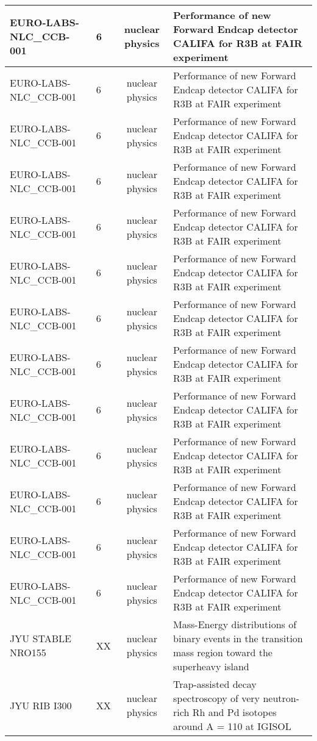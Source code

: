 \begin{xltabular}{\textwidth}{|l|p{0.12\textwidth}|c|Y|}
EURO-LABS-NLC\_CCB-001 & 6 & nuclear physics & Performance of new Forward Endcap detector
CALIFA for R3B at FAIR experiment \\ \hline
EURO-LABS-NLC\_CCB-001 & 6 & nuclear physics & Performance of new Forward Endcap detector
CALIFA for R3B at FAIR experiment \\ \hline
EURO-LABS-NLC\_CCB-001 & 6 & nuclear physics & Performance of new Forward Endcap detector
CALIFA for R3B at FAIR experiment \\ \hline
EURO-LABS-NLC\_CCB-001 & 6 & nuclear physics & Performance of new Forward Endcap detector
CALIFA for R3B at FAIR experiment \\ \hline
EURO-LABS-NLC\_CCB-001 & 6 & nuclear physics & Performance of new Forward Endcap detector
CALIFA for R3B at FAIR experiment \\ \hline
EURO-LABS-NLC\_CCB-001 & 6 & nuclear physics & Performance of new Forward Endcap detector
CALIFA for R3B at FAIR experiment \\ \hline
EURO-LABS-NLC\_CCB-001 & 6 & nuclear physics & Performance of new Forward Endcap detector
CALIFA for R3B at FAIR experiment \\ \hline
EURO-LABS-NLC\_CCB-001 & 6 & nuclear physics & Performance of new Forward Endcap detector
CALIFA for R3B at FAIR experiment \\ \hline
EURO-LABS-NLC\_CCB-001 & 6 & nuclear physics & Performance of new Forward Endcap detector
CALIFA for R3B at FAIR experiment \\ \hline
EURO-LABS-NLC\_CCB-001 & 6 & nuclear physics & Performance of new Forward Endcap detector
CALIFA for R3B at FAIR experiment \\ \hline
EURO-LABS-NLC\_CCB-001 & 6 & nuclear physics & Performance of new Forward Endcap detector
CALIFA for R3B at FAIR experiment \\ \hline
EURO-LABS-NLC\_CCB-001 & 6 & nuclear physics & Performance of new Forward Endcap detector
CALIFA for R3B at FAIR experiment \\ \hline
EURO-LABS-NLC\_CCB-001 & 6 & nuclear physics & Performance of new Forward Endcap detector
CALIFA for R3B at FAIR experiment \\ \hline
JYU STABLE NRO155 & XX & nuclear physics & Mass-Energy distributions of binary events in the transition mass region toward the superheavy island \\ \hline
JYU RIB I300 & XX & nuclear physics & Trap-assisted decay spectroscopy of very neutron-rich Rh and Pd isotopes around A = 110 at IGISOL \\ \hline

\end{xltabular}
